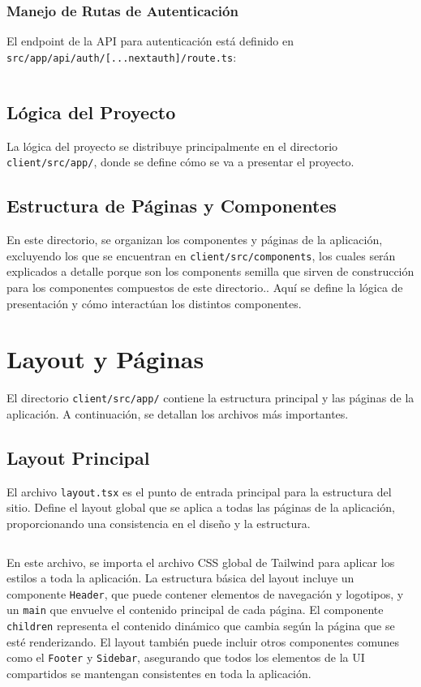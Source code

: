 \subsubsection{Manejo de Rutas de Autenticación}
El endpoint de la API para autenticación está definido en \texttt{src/app/api/auth/[...nextauth]/route.ts}:
\inputminted{typescript}{../client/src/app/api/auth/\[...nextauth\]/route.ts}

\subsection{Lógica del Proyecto}
La lógica del proyecto se distribuye principalmente en el directorio \texttt{client/src/app/}, donde se define cómo se va a presentar el proyecto. 

\subsection{Estructura de Páginas y Componentes}
En este directorio, se organizan los componentes y páginas de la aplicación, excluyendo los que se encuentran en \texttt{client/src/components}, los cuales serán explicados a detalle porque son los components semilla que sirven de construcción para los componentes compuestos de este directorio.. Aquí se define la lógica de presentación y cómo interactúan los distintos componentes.

\section{Layout y Páginas}
El directorio \texttt{client/src/app/} contiene la estructura principal y las páginas de la aplicación. A continuación, se detallan los archivos más importantes.

\subsection{Layout Principal}
El archivo \texttt{layout.tsx} es el punto de entrada principal para la estructura del sitio. Define el layout global que se aplica a todas las páginas de la aplicación, proporcionando una consistencia en el diseño y la estructura.

\inputminted{typescript}{../client/src/app/layout.tsx}

En este archivo, se importa el archivo CSS global de Tailwind para aplicar los estilos a toda la aplicación. La estructura básica del layout incluye un componente \texttt{Header}, que puede contener elementos de navegación y logotipos, y un \texttt{main} que envuelve el contenido principal de cada página. El componente \texttt{children} representa el contenido dinámico que cambia según la página que se esté renderizando.
\singlespacing
El layout también puede incluir otros componentes comunes como el \texttt{Footer} y \texttt{Sidebar}, asegurando que todos los elementos de la UI compartidos se mantengan consistentes en toda la aplicación.

